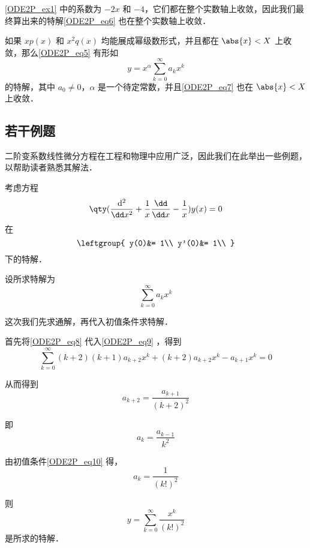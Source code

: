 \autoref{ODE2P_ex1} 中的系数为 $-2x$ 和 $-4$，它们都在整个实数轴上收敛，因此我们最终算出来的特解\autoref{ODE2P_eq6} 也在整个实数轴上收敛．

\begin{theorem}{}\label{ODE2P_the1}
如果 $xp(x)$ 和 $x^2q(x)$ 均能展成幂级数形式，并且都在 $\abs{x}<X$ 上收敛，那么\autoref{ODE2P_eq5} 有形如
\begin{equation}\label{ODE2P_eq7}
y=x^\alpha\sum\limits_{k=0}^\infty a_kx^k
\end{equation}
的特解，其中 $a_0\neq 0$，$\alpha$ 是一个待定常数，并且\autoref{ODE2P_eq7} 也在 $\abs{x}<X$ 上收敛．


\end{theorem}


\subsection{若干例题}

二阶变系数线性微分方程在工程和物理中应用广泛，因此我们在此举出一些例题，以帮助读者熟悉其解法．

\begin{example}{}\label{ODE2P_ex2}
考虑方程
\begin{equation}\label{ODE2P_eq9}
\qty(\frac{\mathrm{d}^2}{\dd x^2}+\frac{1}{x}\frac{\dd}{\dd x}-\frac{1}{x})y(x)=0
\end{equation}
在
\begin{equation}\label{ODE2P_eq10}
\leftgroup{
    y(0)&= 1\\
    y'(0)&= 1\\
}
\end{equation}
下的特解．

设所求特解为
\begin{equation}\label{ODE2P_eq8}
\sum\limits_{k=0}^\infty a_kx^k
\end{equation}

这次我们先求通解，再代入初值条件求特解．

首先将\autoref{ODE2P_eq8} 代入\autoref{ODE2P_eq9} ，得到
\begin{equation}
\sum\limits_{k=0}^\infty (k+2)(k+1)a_{k+2}x^k+(k+2)a_{k+2}x^k-a_{k+1}x^k=0
\end{equation}

从而得到
\begin{equation}
a_{k+2}=\frac{a_{k+1}}{(k+2)^2}
\end{equation}

即
\begin{equation}\label{ODE2P_eq11}
a_k=\frac{a_{k-1}}{k^2}
\end{equation}

由初值条件\autoref{ODE2P_eq10} 得，
\begin{equation}
a_k=\frac{1}{(k!)^2}
\end{equation}

则
\begin{equation}
y=\sum\limits_{k=0}^\infty \frac{x^k}{(k!)^2}
\end{equation}
是所求的特解．


\end{example}


